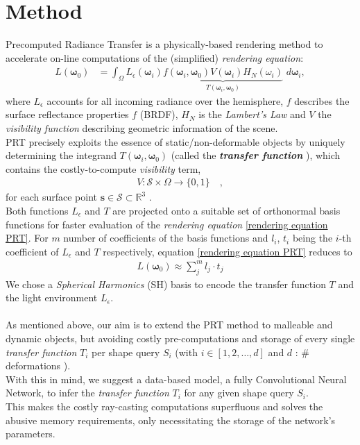 \section{Method}
Precomputed Radiance Transfer  is a physically-based rendering method to accelerate on-line computations of the (simplified) \textit{rendering equation}:
\begin{align}
L(\bm{\omega}_0 ) &= 
\int_{\Omega}   L_{\epsilon}(\bm{\omega}_i ) 
\underbrace{f(\bm{\omega}_i,\bm{\omega}_0) 
V(\bm{\omega}_i) H_N(\omega_i) }_{T(\bm{\omega}_i,\bm{\omega}_0) }
\,  \, d\bm{\omega}_i , 
\label{rendering equation PRT}
\end{align}
where $L_{\epsilon}$ accounts for all incoming radiance over the hemisphere, $f$  describes the surface reflectance properties $f$ (BRDF), $H_N$ is the \textit{Lambert's Law} and $V$ the \textit{visibility function} describing geometric information of the scene.\\
PRT precisely exploits the essence of static/non-deformable objects by uniquely determining the integrand $T(\bm{\omega}_i,\bm{\omega}_0)$ (called the \textbf{\textit{transfer function}} ), which contains the costly-to-compute  \textit{visibility} term,
\begin{align*}
V :  \mathcal{S}  \times \Omega \rightarrow \{0,1\} \quad,
\end{align*}
for each surface point $\bm{s} \in \mathcal{S} \subset \mathbb{R}^3$ \cite{CohenBook}. 
\\
Both functions $L_{\epsilon} $ and $T$  are projected onto a suitable set of orthonormal basis functions for faster evaluation of the \textit{rendering equation} \ref{rendering equation PRT}. 
For $m$ number of coefficients of the basis functions and $l_i$, $t_i$ being the $i$-th coefficient of $L_{\epsilon} $ and $T$ respectively, equation \ref{rendering equation PRT} reduces to \cite{sloan2002precomputed} 
\begin{align}
L(\bm{\omega}_0 ) \approx \sum_{j}^{m} l_j \cdot t_j 
\label{Eq: Reduced Rendering Eq}
\end{align}
We chose a \textit{Spherical Harmonics} (SH) basis to encode the transfer function $T$ and the light environment $L_{\epsilon}$.
\\
\\
 As mentioned above, our aim is to extend the PRT method to malleable and dynamic objects, but avoiding costly pre-computations and storage of every single \textit{transfer function} $T_i$ per shape query $S_i$ (with $i \in [1,2,\dots, d]$ and $d$ : $\#$ deformations ). \\
With this in mind, we suggest a data-based model, a fully Convolutional Neural Network, to infer the \textit{transfer function} $T_i$ for any given shape query $S_i$. \\
This makes the costly ray-casting computations superfluous and solves the abusive memory requirements, only necessitating the storage of the network's parameters. 
